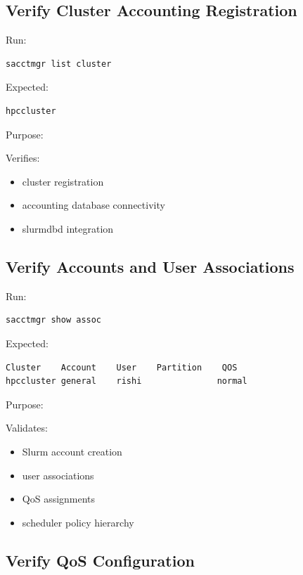 \documentclass[11pt]{article}
\begin{document}
\subsection{Verify Cluster Accounting Registration}
\label{sec:org96099da}

Run:

\begin{verbatim}
sacctmgr list cluster
\end{verbatim}

Expected:

\begin{verbatim}
hpccluster
\end{verbatim}

Purpose:

Verifies:

\begin{itemize}
\item cluster registration
\item accounting database connectivity
\item slurmdbd integration
\end{itemize}
\subsection{Verify Accounts and User Associations}
\label{sec:orgeb6c40e}

Run:

\begin{verbatim}
sacctmgr show assoc
\end{verbatim}

Expected:

\begin{verbatim}
Cluster    Account    User    Partition    QOS
hpccluster general    rishi               normal
\end{verbatim}

Purpose:

Validates:

\begin{itemize}
\item Slurm account creation
\item user associations
\item QoS assignments
\item scheduler policy hierarchy
\end{itemize}
\subsection{Verify QoS Configuration}
\label{sec:org38f2858}
\end{document}
